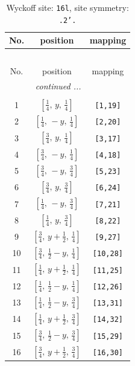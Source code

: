 \documentclass[fleqn,8pt]{jsarticle}
\begin{document}
\renewcommand{\arraystretch}{1.2}
\begin{longtable}{ccc}
\caption{Wyckoff site: {\tt 16l}, site symmetry: {\tt .2'.}}
 \\
 \hline \hline
No. & position & mapping \\ \hline \endfirsthead

\multicolumn{2}{l}{\tablename\ \thetable{}} \\
 \hline \hline
No. & position & mapping \\ \hline \endhead

 \hline \hline
\multicolumn{2}{r}{\footnotesize\it continued ...} \\ \endfoot

 \hline \hline
\multicolumn{2}{r}{} \\ \endlastfoot

1 & $\left[ \frac{1}{4},\, y,\, \frac{1}{4} \right]$ & {\tt [1,19]} \\ \hline
2 & $\left[ \frac{1}{4},\, - y,\, \frac{1}{4} \right]$ & {\tt [2,20]} \\ \hline
3 & $\left[ \frac{3}{4},\, y,\, \frac{1}{4} \right]$ & {\tt [3,17]} \\ \hline
4 & $\left[ \frac{3}{4},\, - y,\, \frac{1}{4} \right]$ & {\tt [4,18]} \\ \hline
5 & $\left[ \frac{3}{4},\, - y,\, \frac{3}{4} \right]$ & {\tt [5,23]} \\ \hline
6 & $\left[ \frac{3}{4},\, y,\, \frac{3}{4} \right]$ & {\tt [6,24]} \\ \hline
7 & $\left[ \frac{1}{4},\, - y,\, \frac{3}{4} \right]$ & {\tt [7,21]} \\ \hline
8 & $\left[ \frac{1}{4},\, y,\, \frac{3}{4} \right]$ & {\tt [8,22]} \\ \hline
9 & $\left[ \frac{3}{4},\, y + \frac{1}{2},\, \frac{1}{4} \right]$ & {\tt [9,27]} \\ \hline
10 & $\left[ \frac{3}{4},\, \frac{1}{2} - y,\, \frac{1}{4} \right]$ & {\tt [10,28]} \\ \hline
11 & $\left[ \frac{1}{4},\, y + \frac{1}{2},\, \frac{1}{4} \right]$ & {\tt [11,25]} \\ \hline
12 & $\left[ \frac{1}{4},\, \frac{1}{2} - y,\, \frac{1}{4} \right]$ & {\tt [12,26]} \\ \hline
13 & $\left[ \frac{1}{4},\, \frac{1}{2} - y,\, \frac{3}{4} \right]$ & {\tt [13,31]} \\ \hline
14 & $\left[ \frac{1}{4},\, y + \frac{1}{2},\, \frac{3}{4} \right]$ & {\tt [14,32]} \\ \hline
15 & $\left[ \frac{3}{4},\, \frac{1}{2} - y,\, \frac{3}{4} \right]$ & {\tt [15,29]} \\ \hline
16 & $\left[ \frac{3}{4},\, y + \frac{1}{2},\, \frac{3}{4} \right]$ & {\tt [16,30]} \\
\end{longtable}
\end{document}
